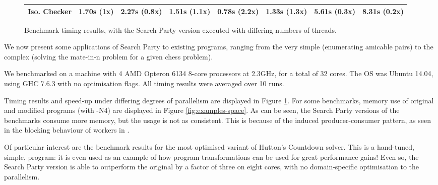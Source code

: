 \begin{figure}[ht]
\begin{tabularx}{\textwidth}{|r|X|X|X|X|X|X|X|}
           Iso. Checker   & 1.70s (1x)
                          & 2.27s (0.8x)
                          & 1.51s (1.1x)
                          & 0.78s (2.2x)
                          & 1.33s (1.3x)
                          & 5.61s (0.3x)
                          & 8.31s (0.2x)\\
    \hline
  \end{tabularx}  
  \caption{Benchmark timing results, with the Search Party version
    executed with differing numbers of threads.}
  \label{fig:examples-time}
\end{figure}

We now present some applications of Search Party to existing programs,
ranging from the very simple (enumerating amicable pairs) to the
complex (solving the mate-in-n problem for a given chess problem).

We benchmarked on a machine with 4 AMD Opteron 6134 8-core processors
at 2.3GHz, for a total of 32 cores. The OS was Ubuntu 14.04, using GHC
7.6.3 with no optimisation flags. All timing results were averaged
over 10 runs.

Timing results and speed-up under differing degrees of parallelism are
displayed in Figure \ref{fig:examples-time}. For some benchmarks,
memory use of original and modified programs (with -N4) are displayed
in Figure \ref{fig:examples-space}. As can be seen, the Search Party
versions of the benchmarks consume more memory, but the usage is not
as consistent. This is because of the induced producer-consumer
pattern, as seen in the blocking behaviour of workers in .

Of particular interest are the benchmark results for the most
optimised variant of Hutton's Countdown solver. This is a hand-tuned,
simple, program: it is even used as an example of how program
transformations can be used for great performance gains! Even so, the
Search Party version is able to outperform the original by a factor of
three on eight cores, with no domain-specific optimisation to the
parallelism.


